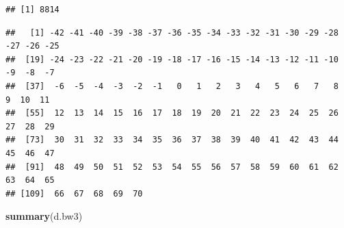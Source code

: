 \documentclass[
]{book}
\newenvironment{Shaded}{\begin{snugshade}}{\end{snugshade}}
\newcommand{\AttributeTok}[1]{\textcolor[rgb]{0.13,0.29,0.53}{#1}}
\newcommand{\FunctionTok}[1]{\textcolor[rgb]{0.13,0.29,0.53}{\textbf{#1}}}
\newcommand{\NormalTok}[1]{#1}
\newcommand{\OtherTok}[1]{\textcolor[rgb]{0.56,0.35,0.01}{#1}}
\newcommand{\SpecialCharTok}[1]{\textcolor[rgb]{0.81,0.36,0.00}{\textbf{#1}}}
\begin{document}
\begin{verbatim}
## [1] 8814
\end{verbatim}

\begin{Shaded}
\end{Shaded}

\begin{verbatim}
##   [1] -42 -41 -40 -39 -38 -37 -36 -35 -34 -33 -32 -31 -30 -29 -28 -27 -26 -25
##  [19] -24 -23 -22 -21 -20 -19 -18 -17 -16 -15 -14 -13 -12 -11 -10  -9  -8  -7
##  [37]  -6  -5  -4  -3  -2  -1   0   1   2   3   4   5   6   7   8   9  10  11
##  [55]  12  13  14  15  16  17  18  19  20  21  22  23  24  25  26  27  28  29
##  [73]  30  31  32  33  34  35  36  37  38  39  40  41  42  43  44  45  46  47
##  [91]  48  49  50  51  52  53  54  55  56  57  58  59  60  61  62  63  64  65
## [109]  66  67  68  69  70
\end{verbatim}

\begin{Shaded}
\begin{Highlighting}[]
\FunctionTok{summary}\NormalTok{(d.bw3)}
\end{Highlighting}
\end{Shaded}
\end{document}
